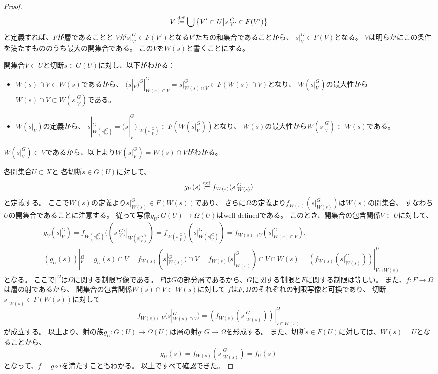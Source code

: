 \documentclass[uplatex]{jsarticle}
\theoremstyle{definition}
\newcommand{\dfn}{\overset{\mathrm{\tiny def}}{\coloneqq}}
\begin{document}
\begin{proof}
  \[V\dfn \bigcup \left\{ V'\subset U \middle| s|_{V'}^G\in F(V')\right\}\]
  と定義すれば、\(F\)が層であることと
  \(V\)が\(s|_{V'}^G\in F(V')\)となる\(V'\)たちの和集合であることから、
  \(s|_V^G\in F(V)\)となる。
  \(V\)は明らかにこの条件を満たすもののうち最大の開集合である。
  この\(V\)を\(W(s)\)と書くことにする。

  開集合\(V\subset U\)と切断\(s\in G(U)\)に対し、以下がわかる：
  \begin{itemize}
    \item
    \(W(s)\cap V \subset W(s)\)であるから、
    \((s|_V)^G|_{W(s)\cap V}^G = s|_{W(s)\cap V}^G\in F(W(s)\cap V)\)となり、
    \(W(s|_V^G)\)の最大性から\(W(s)\cap V \subset W(s|_V^G)\)である。
    \item
    \(W(s|_V)\)の定義から、
    \(s|_{W(s|_V^G)}^G = (s|_V^G)|_{W(s|_V^G)}\in F(W(s|_V^G))\)となり、
    \(W(s)\)の最大性から\(W(s|_V^G)\subset W(s)\)である。
  \end{itemize}
  \(W(s|_V^G)\subset V\)であるから、以上より\(W(s|_V^G) = W(s)\cap V\)がわかる。

  各開集合\(U\subset X\)と
  各切断\(s\in G(U)\)に対して、
  \[
  g_U(s) \dfn f_{W(s)}(s|_{W(s)}^G)
  \]
  と定義する。
  ここで\(W(s)\)の定義より\(s|_{W(s)}^G\in F(W(s))\)であり、
  さらに\(\Omega\)の定義より\(f_{W(s)}(s|_{W(s)}^G)\)は\(W(s)\)の開集合、
  すなわち\(U\)の開集合であることに注意する。
  従って写像\(g_U:G(U)\to \Omega(U)\)はwell-definedである。
  このとき、開集合の包含関係\(V\subset U\)に対して、
  \begin{align*}
    &g_V(s|_V^G)
    = f_{W(s|_V^G)}((s|_V^G)|_{W(s|_V^G)})
    = f_{W(s|_V^G)}(s|_{W(s|_V^G)}^G)
    = f_{W(s)\cap V}(s|_{W(s)\cap V}^G), \\
    &(g_U(s))|_V^{\Omega}
    = g_U(s)\cap V
    = f_{W(s)}(s|_{W(s)}^G) \cap V
    = f_{W(s)}(s|_{W(s)}^G) \cap V \cap W(s)
    = \left( f_{W(s)}(s|_{W(s)}^G) \right)|_{V\cap W(s)}^{\Omega}
  \end{align*}
  となる。
  ここで\(|^{\Omega}\)は\(\Omega\)に関する制限写像である。
  \(F\)は\(G\)の部分層であるから、\(G\)に関する制限と\(F\)に関する制限は等しい。
  また、\(f:F\to \Omega\)は層の射であるから、
  開集合の包含関係\(W(s)\cap V\subset W(s)\)に対して
  \(f\)は\(F,\Omega\)のそれぞれの制限写像と可換であり、
  切断\(s|_{W(s)}\in F(W(s))\)に対して
  \[
  f_{W(s)\cap V}(s|_{W(s)\cap V}^G) = \left( f_{W(s)}(s|_{W(s)}^G) \right)|_{V\cap W(s)}^{\Omega}
  \]
  が成立する。
  以上より、射の族\(g_U:G(U)\to \Omega(U)\)は層の射\(g:G\to \Omega\)を形成する。
  また、切断\(s\in F(U)\)に対しては、\(W(s)=U\)となることから、
  \[
  g_U(s) = f_{W(s)}(s|_{W(s)}^G) = f_U(s)
  \]
  となって、\(f = g\circ i\)を満たすこともわかる。
  以上ですべて確認できた。
\end{proof}
\end{document}
